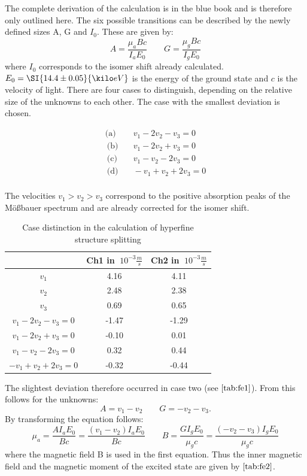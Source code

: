 The complete derivation of the calculation is in the blue book and is therefore only outlined here. The six possible transitions can be described by the newly defined sizes A, G and $I_0$. These are given by:
\begin{equation}
    A = \frac{\mu_aBc}{I_aE_0} \qquad
    G = \frac{\mu_gBc}{I_gE_0}
\end{equation}
where $I_0$ corresponds to the isomer shift already calculated. $E_0 =\SI{14.4\pm0.05}{\kilo eV}$ is the energy of the ground state and $c$ is the velocity of light. There are four cases to distinguish, depending on the relative size of the unknowns to each other. The case with the smallest deviation is chosen.

\begin{align*}
\text{(a)}& \quad v_1-2v_2-v_3=0 \\\
\text{(b)}& \quad v_1-2v_2+v_3=0 \\\
\text{(c)}& \quad v_1-v_2-2v_3=0 \\\
\text{(d)}& \quad -v_1+v_2+2v_3=0 \\\
\end{align*}

The velocities $v_1 >v_2 >v_3$ correspond to the positive absorption peaks of the Mößbauer spectrum and are already corrected for the isomer shift.

\begin{table}
    \centering
    \caption{Case distinction in the calculation of hyperfine structure splitting}
    \begin{tabular}{c c c}
    \toprule
         &Ch1 in $\SI{}{10^{-3}\frac{m}{s}}$ &Ch2 in $\SI{}{10^{-3}\frac{m}{s}}$  \\
         \hline
         $v_1$&4.16 &4.11 \\
         $v_2$&2.48&2.38 \\
         $v_3$&0.69&0.65 \\
         \hline
         $v_1-2v_2-v_3=0$&-1.47&-1.29\\
         $v_1-2v_2+v_3=0$&-0.10&0.01\\
         $v_1-v_2-2v_3=0$&0.32&0.44\\
         $-v_1+v_2+2v_3=0$&-0.32&-0.44\\



    \bottomrule
    \end{tabular}
    \label{tab:fe1}
\end{table}

The slightest deviation therefore occurred in case two (see $\autoref{tab:fe1}$). From this follows for the unknowns:
\begin{equation*}
    A = v_1-v_2 \qquad G = -v_2-v_3.
\end{equation*}
By transforming the equation follows:
\begin{equation}
    \mu_a =\frac{AI_aE_0}{Bc} = \frac{(v_1-v_2)I_aE_0}{Bc} \qquad B= \frac{GI_gE_0}{\mu_gc}=\frac{(-v_2-v_3)I_gE_0}{\mu_gc}
\end{equation}
where the magnetic field B is used in the first equation. Thus the inner magnetic field and the magnetic moment of the excited state are given by $\autoref{tab:fe2}$.
\\


